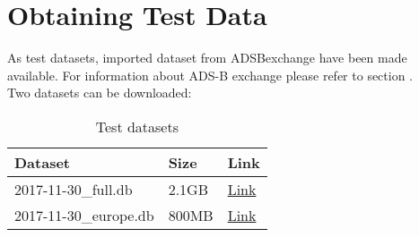 \section{Obtaining Test Data}
\label{sec:test_data} 

As test datasets, imported dataset from ADSBexchange have been made available. For information about ADS-B exchange please refer to section . \\

Two datasets can be downloaded:

\begin{table}[H]
  \center
  \begin{tabular}{ | l | l | l |}
    \hline
    \textbf{Dataset} & Size & \textbf{Link} \\ \hline
    2017-11-30\_full.db & 2.1GB & \href{https://drive.google.com/open?id=19JgE8kgVG2lodIyI6Vo8ac7aNY7pM1i_}{Link} \\ \hline
    2017-11-30\_europe.db & 800MB & \href{https://drive.google.com/open?id=1s73R9IEq_8KePC96-a2_seXxZ-Ybhisd}{Link} \\
    \hline
  \end{tabular}
  \caption{Test datasets}
\end{table}

